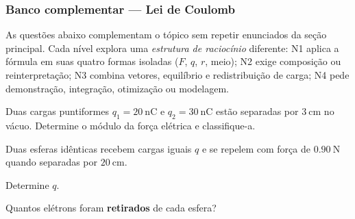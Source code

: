 
\subsubsection*{Banco complementar --- Lei de Coulomb}

\begin{atencao}
As questões abaixo complementam o tópico sem repetir enunciados da seção
principal. Cada nível explora uma \emph{estrutura de raciocínio} diferente:
N1 aplica a fórmula em suas quatro formas isoladas ($F$, $q$, $r$, meio);
N2 exige composição ou reinterpretação; N3 combina vetores, equilíbrio e
redistribuição de carga; N4 pede demonstração, integração, otimização ou
modelagem.
\end{atencao}

\blocofixacao

\begin{questao}[1]{}
Duas cargas puntiformes $q_1=\SI{20}{\nano\coulomb}$ e
$q_2=\SI{30}{\nano\coulomb}$ estão separadas por $\SI{3}{\centi\meter}$ no
vácuo. Determine o módulo da força elétrica e classifique-a.
\end{questao}

\begin{questao}[1]{}
Duas esferas idênticas recebem cargas iguais $q$ e se repelem com força de
$\SI{0.90}{\newton}$ quando separadas por $\SI{20}{\centi\meter}$.
\begin{itensq}
\item Determine $q$.
\item Quantos elétrons foram \textbf{retirados} de cada esfera?
\end{itensq}
\end{questao}


